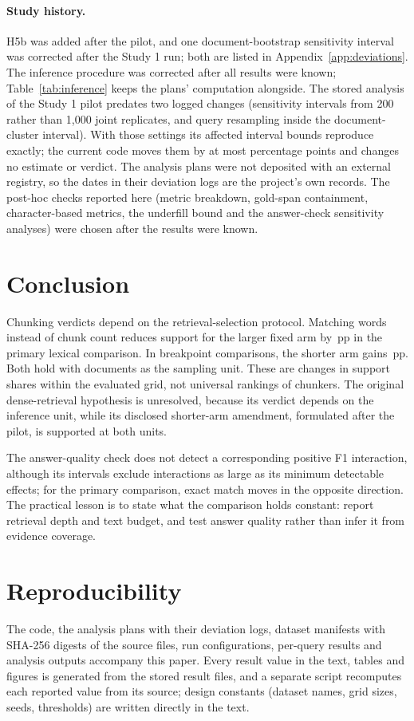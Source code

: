 \documentclass[11pt]{article}
\newcommand{\pp}{\ensuremath{\,\mathrm{pp}}}
\begin{document}
\paragraph{Study history.}
H5b was added after the pilot, and one document-bootstrap sensitivity interval was corrected after the Study 1 run; both are listed in Appendix~\ref{app:deviations}. The inference procedure was corrected after all results were known; Table~\ref{tab:inference} keeps the plans' computation alongside. The stored analysis of the Study 1 pilot predates two logged changes (sensitivity intervals from 200 rather than 1,000 joint replicates, and query resampling inside the document-cluster interval). With those settings its \PilotBounds{} affected interval bounds reproduce exactly; the current code moves them by at most \PilotMaxDiff{} percentage points and changes no estimate or verdict. The analysis plans were not deposited with an external registry, so the dates in their deviation logs are the project's own records. The post-hoc checks reported here (metric breakdown, gold-span containment, character-based metrics, the underfill bound and the answer-check sensitivity analyses) were chosen after the results were known.

\section{Conclusion}
Chunking verdicts depend on the retrieval-selection protocol. Matching words instead of chunk count reduces support for the larger fixed arm by \HOneEst\pp{} in the primary lexical comparison. In breakpoint comparisons, the shorter arm gains \HFourEst\pp{}. Both hold with documents as the sampling unit. These are changes in support shares within the evaluated grid, not universal rankings of chunkers. The original dense-retrieval hypothesis is unresolved, because its verdict depends on the inference unit, while its disclosed shorter-arm amendment, formulated after the pilot, is supported at both units.

The answer-quality check does not detect a corresponding positive F1 interaction, although its intervals exclude interactions as large as its minimum detectable effects; for the primary comparison, exact match moves in the opposite direction. The practical lesson is to state what the comparison holds constant: report retrieval depth and text budget, and test answer quality rather than infer it from evidence coverage.

\section{Reproducibility}\label{sec:reproducibility}
The code, the analysis plans with their deviation logs, dataset manifests with SHA-256 digests of the source files, run configurations, per-query results and analysis outputs accompany this paper. Every result value in the text, tables and figures is generated from the stored result files, and a separate script recomputes each reported value from its source; design constants (dataset names, grid sizes, seeds, thresholds) are written directly in the text.
\end{document}
